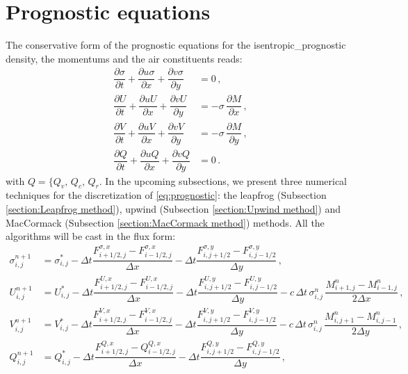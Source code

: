 \documentclass{article}
\numberwithin{equation}{section}
\begin{document}
	\section{Prognostic equations}
		The conservative form of the prognostic equations for the isentropic_prognostic density, the momentums and the air constituents reads:
		\begin{subequations}
			\label{eq:prognostic}
			\begin{align}
				\dfrac{\partial \sigma}{\partial t} + \dfrac{\partial u \sigma}{\partial x} + \dfrac{\partial v \sigma}{\partial y} & = 0 \, , \\
				\dfrac{\partial U}{\partial t} + \dfrac{\partial u U}{\partial x} + \dfrac{\partial v U}{\partial y} & = -\sigma \, \dfrac{\partial M}{\partial x} \, , \\
				\dfrac{\partial V}{\partial t} + \dfrac{\partial u V}{\partial x} + \dfrac{\partial v V}{\partial y} & = -\sigma \, \dfrac{\partial M}{\partial y} \, , \\
				\dfrac{\partial Q}{\partial t} + \dfrac{\partial u Q}{\partial x} + \dfrac{\partial v Q}{\partial y} & = 0 \, .
			\end{align}
		\end{subequations}
		with $Q = \lbrace Q_v, \, Q_c, \, Q_r $. In the upcoming subsections, we present three numerical techniques for the discretization of \eqref{eq:prognostic}: the leapfrog (Subsection \ref{section:Leapfrog method}), upwind (Subsection \ref{section:Upwind method}) and MacCormack (Subsection \ref{section:MacCormack method}) methods. All the algorithms will be cast in the flux form:
		\begin{subequations}
			\label{eq:flux-form}
			\begin{align}
				\sigma_{i,j}^{n+1} & = \sigma_{i,j}^* - \Delta t \dfrac{F_{i+1/2,j}^{\sigma,x} - F_{i-1/2,j}^{\sigma,x}}{\Delta x} - \Delta t \dfrac{F_{i,j+1/2}^{\sigma,y} - F_{i,j-1/2}^{\sigma,y}}{\Delta y} \, , \\
				U_{i,j}^{n+1} & = U_{i,j}^* - \Delta t \dfrac{F_{i+1/2,j}^{U,x} - F_{i-1/2,j}^{U,x}}{\Delta x} - \Delta t \dfrac{F_{i,j+1/2}^{U,y} - F_{i,j-1/2}^{U,y}}{\Delta y} - c \, \Delta t \, \sigma_{i,j}^n \, \dfrac{M_{i+1,j}^n - M_{i-1,j}^n}{2 \Delta x} \, , \\
				V_{i,j}^{n+1} & = V_{i,j}^* - \Delta t \dfrac{F_{i+1/2,j}^{V,x} - F_{i-1/2,j}^{V,x}}{\Delta x} - \Delta t \dfrac{F_{i,j+1/2}^{V,y} - F_{i,j-1/2}^{V,y}}{\Delta y} - c \, \Delta t \, \sigma_{i,j}^n \, \dfrac{M_{i,j+1}^n - M_{i,j-1}^n}{2 \Delta y} \, , \\
				Q_{i,j}^{n+1} & = Q_{i,j}^* - \Delta t \dfrac{F_{i+1/2,j}^{Q,x} - Q_{i-1/2,j}^{Q,x}}{\Delta x} - \Delta t \dfrac{F_{i,j+1/2}^{Q,y} - F_{i,j-1/2}^{Q,y}}{\Delta y} \, ,
			\end{align}
		\end{subequations}
\end{document}
